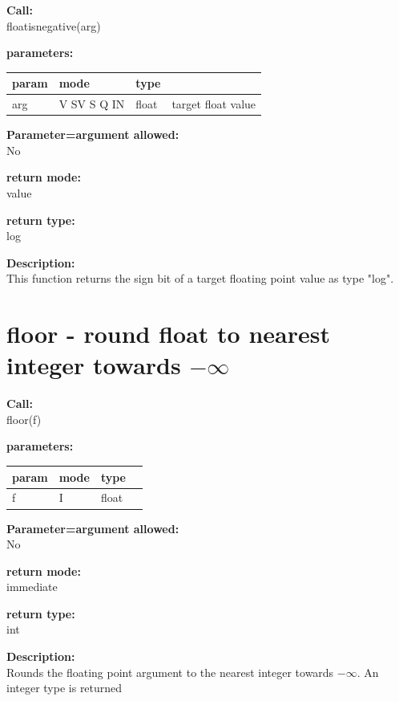         {\bf Call:} \\
        floatisnegative(arg)
        
        {\bf parameters:} \\
        \begin{tabular}{| l | l | l | l |}
        \hline
        param  & mode & type & \\
        \hline \hline
        arg  & V SV S Q IN & float & target float value  \\ \hline
        \end{tabular}
        
        {\bf Parameter=argument allowed:} \\
        No
        
        {\bf return mode:} \\
        value

        {\bf return type:} \\
        log
        
        {\bf Description:} \\
        This function returns the sign bit of a target floating point value
        as type "log".



    \section{floor - round float to nearest integer towards $-\infty$}\label{sec:iffloor}
        
        
        {\bf Call:} \\
        floor(f)
        
        {\bf parameters:} \\
        \begin{tabular}{| l | l | l | l |}
        \hline
        param  & mode & type & \\
        \hline \hline
        f & I & float & \\ \hline
        \end{tabular}
        
        {\bf Parameter=argument allowed:} \\
        No
        
        {\bf return mode:} \\
        immediate

        {\bf return type:} \\
        int
        
        {\bf Description:} \\
        Rounds the floating point argument to the nearest integer towards
        $-\infty$.
        An integer type is returned



